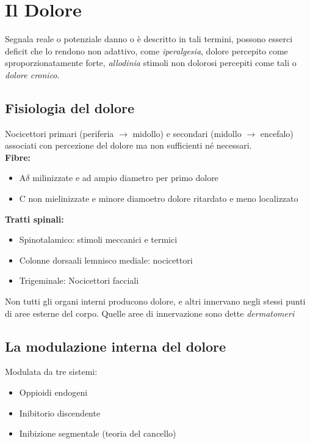 \documentclass[12pt, a4paper]{article}
\begin{document}
\section{Il Dolore}

Segnala reale o potenziale danno o è descritto in tali termini, possono esserci deficit che lo rendono non adattivo, come \emph{iperalgesia}, dolore percepito come sproporzionatamente forte, \emph{allodinia} stimoli non dolorosi percepiti come tali o \emph{dolore cronico}.

\subsection{Fisiologia del dolore}

Nocicettori primari (periferia $\rightarrow$ midollo) e secondari (midollo $\rightarrow$ encefalo) associati con percezione del dolore ma non sufficienti né necessari.
\medskip\\ 
\textbf{Fibre:}
\begin{itemize}
    \item A$\delta$ milinizzate e ad ampio diametro per primo dolore
    \item C non mielinizzate e minore diamoetro dolore ritardato e meno localizzato
\end{itemize}
\textbf{Tratti spinali:}
\begin{itemize}
    \item Spinotalamico: stimoli meccanici e termici
    \item Colonne dorsaali lemnisco mediale: nocicettori
    \item Trigeminale: Nocicettori facciali
\end{itemize}
Non tutti gli organi interni producono dolore, e altri innervano negli stessi punti di aree esterne del corpo.
Quelle aree di innervazione sono dette \emph{dermatomeri} 

\subsection{La modulazione interna del dolore}

Modulata da tre sistemi:
\begin{itemize}
    \item Oppioidi endogeni 
    \item Inibitorio discendente
    \item Inibizione segmentale (teoria del cancello)
\end{itemize}
\end{document}
